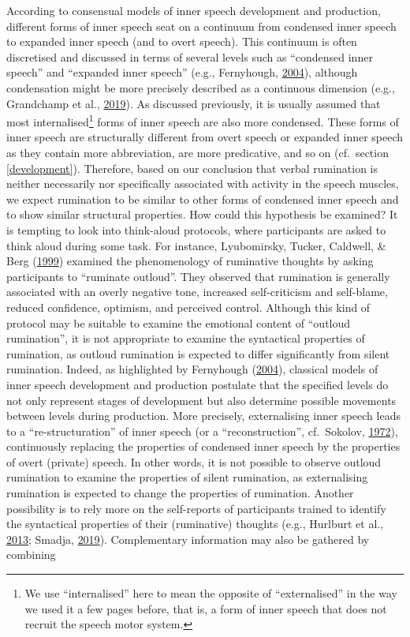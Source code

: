 \documentclass[a4paper,12pt,twoside,onecolumn,openright,final,oldfontcommands]{memoir}
\let\rmarkdownfootnote\footnote%
\def\footnote{\protect\rmarkdownfootnote}
\begin{document}
According to consensual models of inner speech development and production, different forms of inner speech seat on a continuum from condensed inner speech to expanded inner speech (and to overt speech). This continuum is often discretised and discussed in terms of several levels such as \enquote{condensed inner speech} and \enquote{expanded inner speech} (e.g., Fernyhough, \protect\hyperlink{ref-fernyhough_alien_2004}{2004}), although condensation might be more precisely described as a continuous dimension (e.g., Grandchamp et al., \protect\hyperlink{ref-grandchamp_neurocognitive_2019}{2019}). As discussed previously, it is usually assumed that most internalised\footnote{We use \enquote{internalised} here to mean the opposite of \enquote{externalised} in the way we used it a few pages before, that is, a form of inner speech that does not recruit the speech motor system.} forms of inner speech are also more condensed. These forms of inner speech are structurally different from overt speech or expanded inner speech as they contain more abbreviation, are more predicative, and so on (cf.~section \ref{development}). Therefore, based on our conclusion that verbal rumination is neither necessarily nor specifically associated with activity in the speech muscles, we expect rumination to be similar to other forms of condensed inner speech and to show similar structural properties. How could this hypothesis be examined? It is tempting to look into think-aloud protocols, where participants are asked to think aloud during some task. For instance, Lyubomirsky, Tucker, Caldwell, \& Berg (\protect\hyperlink{ref-lyubomirsky_why_1999}{1999}) examined the phenomenology of ruminative thoughts by asking participants to \enquote{ruminate outloud}. They observed that rumination is generally associated with an overly negative tone, increased self-criticism and self-blame, reduced confidence, optimism, and perceived control. Although this kind of protocol may be suitable to examine the emotional content of \enquote{outloud rumination}, it is not appropriate to examine the syntactical properties of rumination, as outloud rumination is expected to differ significantly from silent rumination. Indeed, as highlighted by Fernyhough (\protect\hyperlink{ref-fernyhough_alien_2004}{2004}), classical models of inner speech development and production postulate that the specified levels do not only represent stages of development but also determine possible movements between levels during production. More precisely, externalising inner speech leads to a \enquote{re-structuration} of inner speech (or a ``reconstruction'', cf.~Sokolov, \protect\hyperlink{ref-sokolov_inner_1972}{1972}), continuously replacing the properties of condensed inner speech by the properties of overt (private) speech. In other words, it is not possible to observe outloud rumination to examine the properties of silent rumination, as externalising rumination is expected to change the properties of rumination. Another possibility is to rely more on the self-reports of participants trained to identify the syntactical properties of their (ruminative) thoughts (e.g., Hurlburt et al., \protect\hyperlink{ref-Hurlburt2013}{2013}; Smadja, \protect\hyperlink{ref-smadja_parole_2019}{2019}). Complementary information may also be gathered by combining 
\end{document}
